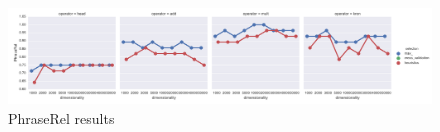 \begin{figure}
  \centering

    \includegraphics[width=\textwidth]{supplement/figures/phraserel-results}
  \caption{PhraseRel results}
  \label{fig:phraserel-results}
\end{figure}

